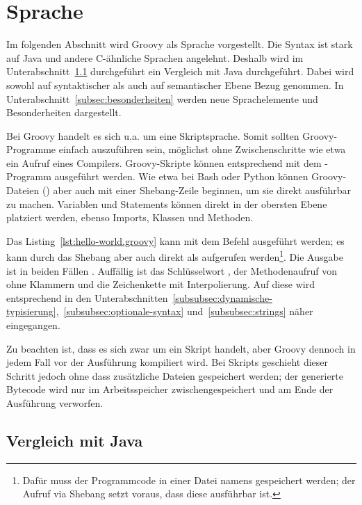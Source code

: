 	\section{Sprache}\label{sec:sprache}

	Im folgenden Abschnitt wird Groovy als Sprache vorgestellt.
	Die Syntax ist stark auf Java und andere C-ähnliche Sprachen angelehnt.
	Deshalb wird im Unterabschnitt~\ref{subsec:vergleichMitJava} durchgeführt ein Vergleich mit Java durchgeführt.
	Dabei wird sowohl auf syntaktischer als auch auf semantischer Ebene Bezug genommen.
	In Unterabschnitt~\ref{subsec:besonderheiten} werden neue Sprachelemente und Besonderheiten dargestellt.

	Bei Groovy handelt es sich {u.a.} um eine Skriptsprache.
	Somit sollten Groovy-Programme einfach auszuführen sein, möglichst ohne Zwischenschritte wie etwa ein Aufruf eines Compilers.
	Groovy-Skripte können entsprechend mit dem -Programm ausgeführt werden.
	Wie etwa bei Bash oder Python können Groovy-Dateien () aber auch mit einer Shebang-Zeile beginnen, um sie direkt ausführbar zu machen.
	Variablen und Statements können direkt in der obersten Ebene platziert werden, ebenso Imports, Klassen und Methoden.


	Das Listing~\ref{lst:hello-world.groovy} kann mit dem Befehl  ausgeführt werden;
	es kann durch das Shebang aber auch direkt als  aufgerufen werden\footnote{Dafür muss der Programmcode in einer Datei namens  gespeichert werden;
	der Aufruf via Shebang setzt voraus, dass diese ausführbar ist.}.
	Die Ausgabe ist in beiden Fällen .
	Auffällig ist das Schlüsselwort , der Methodenaufruf von  ohne Klammern und die Zeichenkette mit Interpolierung.
	Auf diese wird entsprechend in den Unterabschnitten~\ref{subsubsec:dynamische-typisierung},~\ref{subsubsec:optionale-syntax} und~\ref{subsubsec:strings} näher eingegangen.

	Zu beachten ist, dass es sich zwar um ein Skript handelt, aber Groovy dennoch in jedem Fall vor der Ausführung kompiliert wird.
	Bei Skripts geschieht dieser Schritt jedoch ohne dass zusätzliche Dateien gespeichert werden;
	der generierte Bytecode wird nur im Arbeitsspeicher zwischengespeichert und am Ende der Ausführung verworfen.

	\subsection{Vergleich mit Java}\label{subsec:vergleichMitJava}

